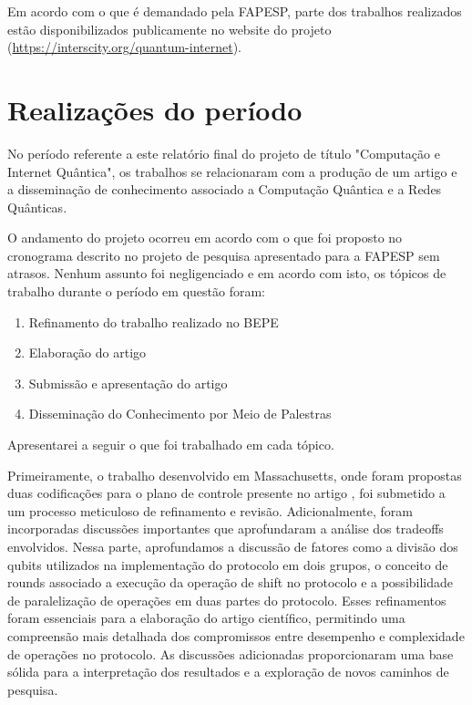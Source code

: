 \documentclass{article}
\begin{document}
    Em acordo com o que é demandado pela FAPESP, parte dos trabalhos realizados estão disponibilizados publicamente no website do projeto (\href{https://interscity.org/quantum-internet/}{https://interscity.org/quantum-internet}).



\section{Realizações do período}
    No período referente a este relatório final do projeto de título "Computação e Internet Quântica", os trabalhos se relacionaram com a produção de um artigo e a disseminação de conhecimento associado a Computação Quântica e a Redes Quânticas.

    O andamento do projeto ocorreu em acordo com o que foi proposto no cronograma descrito no projeto de pesquisa apresentado para a FAPESP sem atrasos. Nenhum assunto foi negligenciado e em acordo com isto, os tópicos de trabalho durante o período em questão foram:
    \begin{enumerate}
        
        \item Refinamento do trabalho realizado no BEPE
        \item Elaboração do artigo
        \item Submissão e apresentação do artigo
        \item Disseminação do Conhecimento por Meio de Palestras
    \end{enumerate}
    
    Apresentarei a seguir o que foi trabalhado em cada tópico.
    
    Primeiramente, o trabalho desenvolvido em Massachusetts, onde foram propostas duas codificações para o plano de controle presente no artigo \cite{universalcontrolplane}, foi submetido a um processo meticuloso de refinamento e revisão. Adicionalmente, foram incorporadas discussões importantes que aprofundaram a análise dos tradeoffs envolvidos. Nessa parte, aprofundamos a discussão de fatores como a divisão dos qubits utilizados na implementação do protocolo em dois grupos, o conceito de rounds associado a execução da operação de shift no protocolo e a possibilidade de paralelização de operações em duas partes do protocolo. Esses refinamentos foram essenciais para a elaboração do artigo científico, permitindo uma compreensão mais detalhada dos compromissos entre desempenho e complexidade de operações no protocolo. As discussões adicionadas proporcionaram uma base sólida para a interpretação dos resultados e a exploração de novos caminhos de pesquisa.
    
\end{document}
